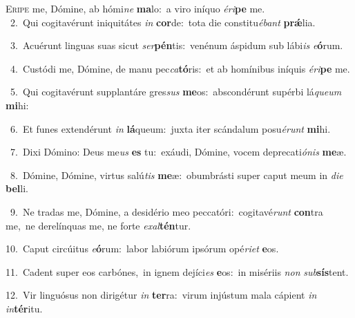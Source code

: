 \lettrine{\initial\textcolor{\initialcolor}{E}}{ripe} me, Dómine, ab hómi\textit{ne} \textbf{ma}\-lo:~\star a viro iníquo \textit{é}\-\textit{ri}\textbf{pe} me.\\
{\numbfont\textcolor{\numbcolor}{~2.}}~Qui cogitavérunt iniquitátes \textit{in} \textbf{cor}\-de:~\star tota die constitu\-\textit{é}\-\textit{bant} \textbf{prǽ}\-lia.\par
{\numbfont\textcolor{\numbcolor}{~3.}}~Acuérunt linguas suas sicut \textit{ser}\-\textbf{pén}tis:~\star venénum áspidum sub lábi\textit{is} \textit{e}\-\textbf{ó}rum.\par
{\numbfont\textcolor{\numbcolor}{~4.}}~Custódi me, Dómine, de manu pec\-\textit{ca}\-\textbf{tó}ris:~\star et ab homínibus iníquis \textit{é}\-\textit{ri}\textbf{pe} me.\par
{\numbfont\textcolor{\numbcolor}{~5.}}~Qui cogitavérunt supplantáre gres\textit{sus} \textbf{me}\-os:~\star abscondérunt supérbi lá\-\textit{que}\-\textit{um} \textbf{mi}\-hi:\par
{\numbfont\textcolor{\numbcolor}{~6.}}~Et funes extendérunt \textit{in} \textbf{lá}\-queum:~\star juxta iter scándalum posu\-\textit{é}\-\textit{runt} \textbf{mi}\-hi.\par
{\numbfont\textcolor{\numbcolor}{~7.}}~Dixi Dómino: Deus me\textit{us} \textbf{es} tu:~\star exáudi, Dómine, vocem deprecati\-\textit{ó}\-\textit{nis} \textbf{me}\-æ.\par
{\numbfont\textcolor{\numbcolor}{~8.}}~Dómine, Dómine, virtus salú\textit{tis} \textbf{me}\-æ:~\star obumbrásti super caput meum in \textit{di}\-\textit{e} \textbf{bel}\-li.\par
{\numbfont\textcolor{\numbcolor}{~9.}}~Ne tradas me, Dómine, a desidério meo peccatóri:~\dagger cogitavé\textit{runt} \textbf{con}\-tra me,~\star ne derelínquas me, ne forte \textit{ex}\-\textit{al}\textbf{tén}tur.\par
{\numbfont\textcolor{\numbcolor}{10.}}~Caput circúitus \textit{e}\-\textbf{ó}rum:~\star labor labiórum ipsórum opé\-\textit{ri}\-\textit{et} \textbf{e}\-os.\par
{\numbfont\textcolor{\numbcolor}{11.}}~Cadent super eos carbónes,~\dagger in ignem dejíci\textit{es} \textbf{e}\-os:~\star in misériis \textit{non} \textit{sub}\-\textbf{sís}tent.\par
{\numbfont\textcolor{\numbcolor}{12.}}~Vir linguósus non dirigétur \textit{in} \textbf{ter}\-ra:~\star virum injústum mala cápient \textit{in} \textit{in}\-\textbf{tér}itu.\par
